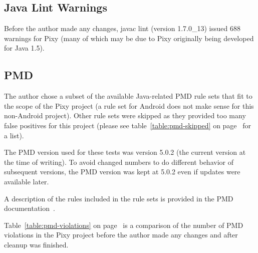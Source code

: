 \subsection{Java Lint Warnings}

Before the author made any changes, javac lint (version 1.7.0\_13) issued 688 warnings for Pixy (many of which may be due to Pixy originally being developed for Java 1.5).

\subsection{PMD}

The author chose a subset of the available Java-related PMD rule sets that fit to the scope of the Pixy project (\eg a rule set for Android does not make sense for this non-Android project). Other rule sets were skipped as they provided too many false positives for this project (please see table~\ref{table:pmd-skipped} on page~\pageref{table:pmd-skipped} for a list).

The PMD version used for these tests was version 5.0.2 (the current version at the time of writing). To avoid changed numbers to do different behavior of subsequent versions, the PMD version was kept at 5.0.2 even if updates were available later.

A description of the rules included in the rule sets is provided in the PMD documentation~\cite{pmd-rulesets}.

Table~\ref{table:pmd-violations} on page~\pageref{table:junit-before} is a comparison of the number of PMD violations in the Pixy project before the author made any changes and after cleanup was finished.

